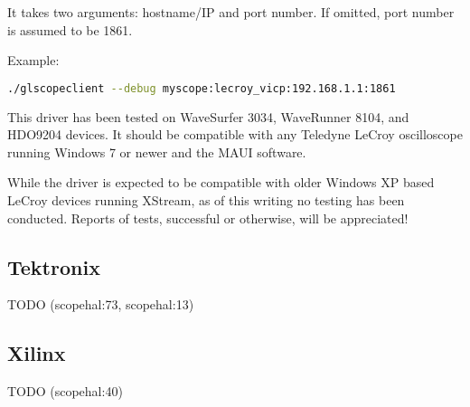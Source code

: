 It takes two arguments: hostname/IP and port number. If omitted, port number is assumed to be 1861.

Example:
\begin{lstlisting}[language=sh]
./glscopeclient --debug myscope:lecroy_vicp:192.168.1.1:1861
\end{lstlisting}

This driver has been tested on WaveSurfer 3034, WaveRunner 8104, and HDO9204 devices. It should be compatible with any
Teledyne LeCroy oscilloscope running Windows 7 or newer and the MAUI software.

While the driver is expected to be compatible with older Windows XP based LeCroy devices running XStream, as of this
writing no testing has been conducted. Reports of tests, successful or otherwise, will be appreciated!

\subsection{Tektronix}
TODO (scopehal:73, scopehal:13)

\subsection{Xilinx}
TODO (scopehal:40)
